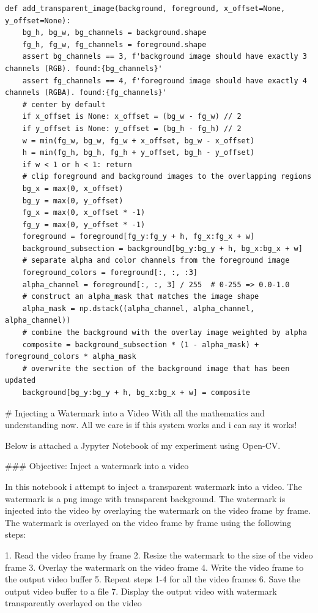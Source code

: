 \documentclass[ebook,12pt,oneside,openany]{memoir}
\begin{document}
\begin{lstlisting}[frame=single,breaklines,globe=5]
    def add_transparent_image(background, foreground, x_offset=None, y_offset=None):
    bg_h, bg_w, bg_channels = background.shape
    fg_h, fg_w, fg_channels = foreground.shape
    assert bg_channels == 3, f'background image should have exactly 3 channels (RGB). found:{bg_channels}'
    assert fg_channels == 4, f'foreground image should have exactly 4 channels (RGBA). found:{fg_channels}'
    # center by default
    if x_offset is None: x_offset = (bg_w - fg_w) // 2
    if y_offset is None: y_offset = (bg_h - fg_h) // 2
    w = min(fg_w, bg_w, fg_w + x_offset, bg_w - x_offset)
    h = min(fg_h, bg_h, fg_h + y_offset, bg_h - y_offset)
    if w < 1 or h < 1: return
    # clip foreground and background images to the overlapping regions
    bg_x = max(0, x_offset)
    bg_y = max(0, y_offset)
    fg_x = max(0, x_offset * -1)
    fg_y = max(0, y_offset * -1)
    foreground = foreground[fg_y:fg_y + h, fg_x:fg_x + w]
    background_subsection = background[bg_y:bg_y + h, bg_x:bg_x + w]
    # separate alpha and color channels from the foreground image
    foreground_colors = foreground[:, :, :3]
    alpha_channel = foreground[:, :, 3] / 255  # 0-255 => 0.0-1.0
    # construct an alpha_mask that matches the image shape
    alpha_mask = np.dstack((alpha_channel, alpha_channel, alpha_channel))
    # combine the background with the overlay image weighted by alpha
    composite = background_subsection * (1 - alpha_mask) + foreground_colors * alpha_mask
    # overwrite the section of the background image that has been updated
    background[bg_y:bg_y + h, bg_x:bg_x + w] = composite
\end{lstlisting}


\begin{markdown}
# Injecting a Watermark into a Video
With all the mathematics and understanding now. All we care is if this system works and i can say it works!

Below is attached a Jypyter Notebook of my experiment using Open-CV.

### Objective: Inject a watermark into a video

In this notebook i attempt to inject a transparent watermark into a
video. The watermark is a png image with transparent background. The
watermark is injected into the video by overlaying the watermark on the
video frame by frame. The watermark is overlayed on the video frame by
frame using the following steps:

1.  Read the video frame by frame
2.  Resize the watermark to the size of the video frame
3.  Overlay the watermark on the video frame
4.  Write the video frame to the output video buffer
5.  Repeat steps 1-4 for all the video frames
6.  Save the output video buffer to a file
7.  Display the output video with watermark transparently overlayed on
    the video
\end{markdown}
\end{document}
